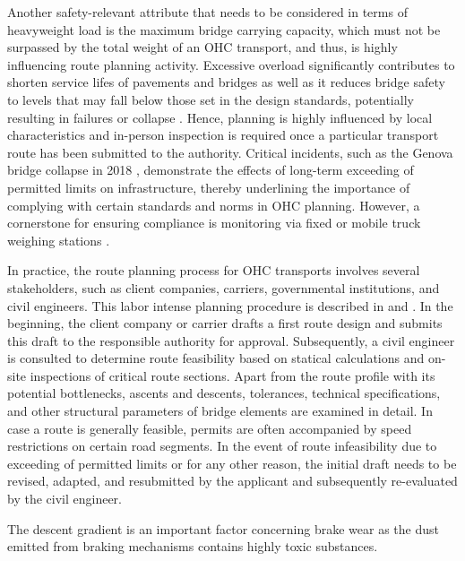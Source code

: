 Another safety-relevant attribute that needs to be considered in terms of heavyweight load is the maximum bridge carrying capacity, which must not be surpassed by the total weight of an OHC transport, and thus, is highly influencing route planning activity.
Excessive overload significantly contributes to shorten service lifes of pavements and bridges as well as it reduces bridge safety to levels that may fall below those set in the design standards, potentially resulting in failures or collapse \cite{fiorillo2018fragility, yan2018optimal, ghosn2000development, wu2019assessment, lou2016effect}. Hence, planning is highly influenced by local characteristics and in-person inspection is required once a particular transport route has been submitted to the authority.
Critical incidents, such as the Genova bridge collapse in 2018 \cite{Morgese.2020, MorandiNYTimes},  demonstrate the effects of long-term exceeding of permitted limits on infrastructure, thereby underlining the importance of complying with certain standards and norms in OHC planning. However, a cornerstone for ensuring compliance is monitoring via fixed or mobile truck weighing stations \cite{fiorillo2016minimizing}.
\par In practice, the route planning process for OHC transports involves several stakeholders, such as client companies, carriers, governmental institutions, and civil engineers.
This labor intense planning procedure is described in \cite{Osegueda.1999} and \cite{ray2007web}. In the beginning, the client company or carrier drafts a first route design and submits this draft to the responsible authority for approval.
Subsequently, a civil engineer is consulted to determine route feasibility based on statical calculations and on-site inspections of critical route sections. Apart from the route profile with its potential bottlenecks, ascents and descents, tolerances, technical specifications, and other structural parameters of bridge elements are examined in detail. In case a route is generally feasible, permits are often accompanied by speed restrictions on certain road segments. In the event of route infeasibility due to exceeding of permitted limits or for any other reason, the initial draft needs to be revised, adapted, and resubmitted by the applicant and subsequently re-evaluated by the civil engineer.

{\color{red}
The descent gradient is an important factor concerning brake wear as the dust emitted from  braking mechanisms \cite{Gerlofs2019}  contains highly toxic substances.
}

